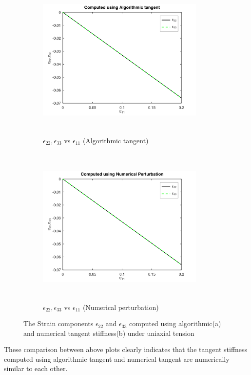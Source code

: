 \documentclass[a4paper,12pt,twoside]{report}
\begin{document}
\begin{figure}[htbp!]
     \begin{subfigure}{0.4\textwidth}
         \includegraphics[width=8.3cm,height=8cm,keepaspectratio]{22.e11vse22e33_ATS.png}
         \caption{$\epsilon_{22},\epsilon_{33}$ vs $\epsilon_{11}$ (Algorithmic tangent)}
         \label{fig:Algorithmic tangent}
     \end{subfigure}  
     \hspace{1.8cm}
     \begin{subfigure}{0.4\textwidth}
         \includegraphics[width=8.3cm,height=8cm,keepaspectratio]{22.e11vse22e33_NT.png}
         \caption{$\epsilon_{22},\epsilon_{33}$ vs $\epsilon_{11}$ (Numerical perturbation)}
         \label{fig:Numerical perturbation}
     \end{subfigure}
        \caption{The Strain components $\epsilon_{22}$ and $\epsilon_{33}$ computed using algorithmic(a) and numerical tangent stiffness(b) under uniaxial tension}
        \label{fig: Algorithmic and numerical tangent stiffness under uniaxial tension}     
\end{figure}
\FloatBarrier
These comparison between above plots clearly indicates that the tangent stiffness computed using algorithmic tangent and numerical tangent are numerically similar to each other.
\end{document}
